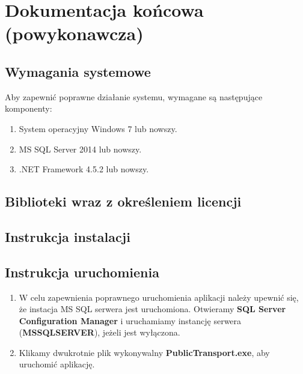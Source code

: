 \documentclass[10pt,a4paper]{article}
\begin{document}
\section{Dokumentacja końcowa (powykonawcza)}

\subsection{Wymagania systemowe}
Aby zapewnić poprawne działanie systemu, wymagane są następujące komponenty:
\begin{enumerate}
	\item System operacyjny Windows 7 lub nowszy.
	\item MS SQL Server 2014 lub nowszy.
	\item .NET Framework 4.5.2 lub nowszy.
\end{enumerate}
%

\subsection{Biblioteki wraz z określeniem licencji}
%

\subsection{Instrukcja instalacji}
%

\subsection{Instrukcja uruchomienia}
\begin{enumerate}
	\item W celu zapewnienia poprawnego uruchomienia aplikacji należy upewnić się, że instacja MS SQL serwera jest uruchomiona. Otwieramy \textbf{SQL Server Configuration Manager} i uruchamiamy instancję serwera (\textbf{MSSQLSERVER}), jeżeli jest wyłączona.
	\item Klikamy dwukrotnie plik wykonywalny \textbf{PublicTransport.exe}, aby uruchomić aplikację.
\end{enumerate}
% 
\end{document}
